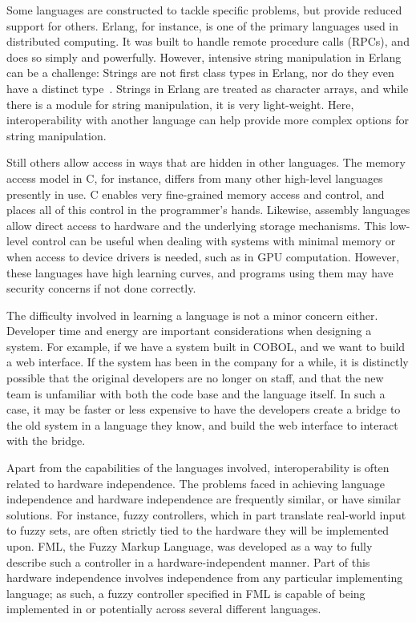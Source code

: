 \documentclass{sig-alternate}
\begin{document}
Some languages are constructed to tackle specific problems, but provide reduced support for others. Erlang, for instance, is one of the primary languages used in distributed computing. It was built to handle remote procedure calls (RPCs), and does so simply and powerfully. However, intensive string manipulation in Erlang can be a challenge: Strings are not first class types in Erlang, nor do they even have a distinct type~\cite{ErlangTypeDoc}. Strings in Erlang are treated as character arrays, and while there is a module for string manipulation, it is very light-weight. Here, interoperability with another language can help provide more complex options for string manipulation.

Still others allow access in ways that are hidden in other languages. The memory access model in C, for instance, differs from many other high-level languages presently in use. C enables very fine-grained memory access and control, and places all of this control in the programmer's hands. Likewise, assembly languages allow direct access to hardware and the underlying storage mechanisms. This low-level control can be useful when dealing with systems with minimal memory or when access to device drivers is needed, such as in GPU computation.  However, these languages have high learning curves, and programs using them may have security concerns if not done correctly.

The difficulty involved in learning a language is not a minor concern either. Developer time and energy are important considerations when designing a system.
For example, if we have a system built in COBOL, and we want to build a web interface. If the system has been in the company for a while, it is distinctly possible that the original developers are no longer on staff, and that the new team is unfamiliar with both the code base and the language itself. In such a case, it may be faster or less expensive to have the developers create a bridge to the old system in a language they know, and build the web interface to interact with the bridge.

Apart from the capabilities of the languages involved, interoperability is often related to hardware independence. The problems faced in achieving language independence and hardware independence are frequently similar, or have similar solutions. For instance, fuzzy controllers, which in part translate real-world input to fuzzy sets, are often strictly tied to the hardware they will be implemented upon. FML, the Fuzzy Markup Language, was developed as a way to fully describe such a controller in a hardware-independent manner. Part of this hardware independence involves independence from any particular implementing language; as such, a fuzzy controller specified in FML is capable of being implemented in or potentially across several different languages.~\cite{Acampora:2013}
\end{document}
